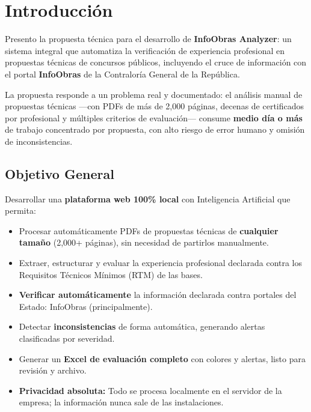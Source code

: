 \documentclass[11pt,a4paper]{article}
\begin{document}
\section{Introducción}

Presento la propuesta técnica para el desarrollo de \textbf{InfoObras Analyzer}: un sistema integral que automatiza la verificación de experiencia profesional en propuestas técnicas de concursos públicos, incluyendo el cruce de información con el portal \textbf{InfoObras} de la Contraloría General de la República.

La propuesta responde a un problema real y documentado: el análisis manual de propuestas técnicas —con PDFs de más de 2,000 páginas, decenas de certificados por profesional y múltiples criterios de evaluación— consume \textbf{medio día o más} de trabajo concentrado por propuesta, con alto riesgo de error humano y omisión de inconsistencias.

\subsection{Objetivo General}

Desarrollar una \textbf{plataforma web 100\% local} con Inteligencia Artificial que permita:
\begin{itemize}[leftmargin=*,noitemsep]
    \item Procesar automáticamente PDFs de propuestas técnicas de \textbf{cualquier tamaño} (2,000+ páginas), sin necesidad de partirlos manualmente.
    \item Extraer, estructurar y evaluar la experiencia profesional declarada contra los Requisitos Técnicos Mínimos (RTM) de las bases.
    \item \textbf{Verificar automáticamente} la información declarada contra portales del Estado: InfoObras (principalmente).
    \item Detectar \textbf{inconsistencias} de forma automática, generando alertas clasificadas por severidad.
    \item Generar un \textbf{Excel de evaluación completo} con colores y alertas, listo para revisión y archivo.
    \item \textbf{Privacidad absoluta:} Todo se procesa localmente en el servidor de la empresa; la información nunca sale de las instalaciones.
\end{itemize}
\end{document}

